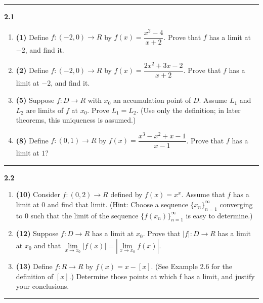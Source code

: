 \documentclass[fleqn]{article}
\begin{document}
  \rule{15cm}{2pt}

  \textbf{2.1}
  \begin{enumerate}
    \item \textbf{(1)} Define $f: (-2, 0) \longrightarrow R$ by $f(x)=\dfrac{x^2-4}{x+2}$. Prove that $f$ has a limit 
    at $-2$, and find it.
    
    
    \item \textbf{(2)} Define $f: (-2, 0) \longrightarrow R$ by $f(x)=\dfrac{2x^2+3x-2}{x+2}$. Prove that $f$ has a limit 
    at $-2$, and find it.


    \item \textbf{(5)} Suppose $f: D \longrightarrow R$ with $x_0$ an accumulation point of $D$. Assume $L_1$ and $L_2$ 
    are limits of $f$ at $x_0$. Prove $L_1=L_2$. (Use only the definition; in later theorems, this uniqueness is
    assumed.) 


    \item \textbf{(8)} Define $f: (0, 1) \longrightarrow R$ by $f(x)=\dfrac{x^3-x^2+x-1}{x-1}$. Prove that $f$ has a limit at $1$?

  \end{enumerate}

  \rule{15cm}{2pt}

  \textbf{2.2}
  \begin{enumerate}
    \item \textbf{(10)} Consider $f: (0,2) \longrightarrow R$ defined by $f(x)=x^x$. Assume that $f$ has a limit at $0$ and find that limit.
    (Hint: Choose a sequence $\{x_n\}_{n=1}^{\infty}$ converging to $0$ such that the limit of the
    sequence $\{f(x_n)\}_{n=1}^{\infty}$ is easy to determine.)


    \item \textbf{(12)} Suppose $f: D \longrightarrow R$ has a limit at $x_0$. Prove that $|f|: D \longrightarrow R$ has 
    a limit at $x_0$ and that $\lim\limits_{x \to x_0} |f(x)|=|\lim\limits_{x \to x_0} f(x)|$.


    \item \textbf{(13)} Define $f: R \longrightarrow R$ by $f(x)=x-[x]$. (See Example 2.6 for the definition 
    of $[x]$.) Determine those points at which f has a limit, and justify your conclusions.

  \end{enumerate}

  \rule{15cm}{2pt}
\end{document}
